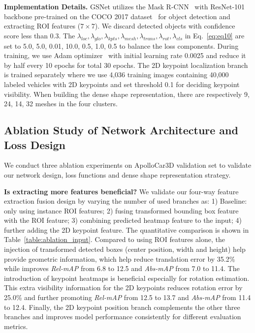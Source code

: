 \documentclass[runningheads]{llncs}
\begin{document}
\smallskip\noindent\textbf{Implementation Details.}
GSNet utilizes the Mask R-CNN~\cite{he2017mask} with ResNet-101 backbone pre-trained on the COCO 2017 dataset~\cite{lin2014microsoft} for object detection and extracting ROI features ($7\times7$). We discard detected objects with confidence score less than 0.3. The $\lambda_{loc}, \lambda_{glo},\lambda_{kpts},\lambda_{mesh}, \lambda_{trans}, \lambda_{rot},\lambda_{cls}$ in Eq.~\ref{eq:eq10} are set to 5.0, 5.0, 0.01, 10.0, 0.5, 1.0, 0.5 to balance the loss components.
During training, we use Adam optimizer~\cite{kingma2014adam} with initial learning rate 0.0025 and reduce it by half every 10 epochs for total 30 epochs. The 2D keypoint localization branch is trained separately where we use 4,036 training images containing 40,000 labeled vehicles with 2D keypoints and set threshold 0.1 for deciding keypoint visibility. When building the dense shape representation, there are respectively 9, 24, 14, 32 meshes in the four clusters.

\subsection{Ablation Study of Network Architecture and Loss Design}
\label{sec:ablation} 
We conduct three ablation experiments on ApolloCar3D validation set to validate our network design, loss functions and dense shape representation strategy.

\smallskip\noindent\textbf{Is extracting more features beneficial?}
We validate our four-way feature extraction fusion design by varying the number of used branches as:
1) Baseline: only using instance ROI features;
2) fusing transformed bounding box feature with the ROI feature;
3) combining predicted heatmap feature to the input;
4) further adding the 2D keypoint feature.
The quantitative comparison is shown in Table~\ref{table:ablation_input}. Compared to using ROI features alone, the injection of transformed detected boxes (center position, width and height) help provide geometric information, which help reduce translation error by 35.2\% while improves \textit{Rel-mAP} from 6.8 to 12.5 and \textit{Abs-mAP} from 7.0 to 11.4. 
The introduction of keypoint heatmaps is beneficial especially for rotation estimation. This extra visibility information for the 2D keypoints reduces rotation error by 25.0\% and further promoting \textit{Rel-mAP} from 12.5 to 13.7 and \textit{Abs-mAP} from 11.4 to 12.4. Finally, the 2D keypoint position branch complements the other three branches and improves model performance consistently for different evaluation metrics.
\end{document}
